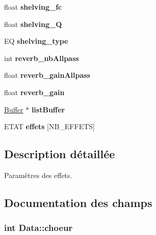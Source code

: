 \begin{DoxyCompactItemize}
\item 
float {\bfseries shelving\+\_\+fc}\hypertarget{structData_acc41c5321d720af7ef090304d57bebbe}{}\label{structData_acc41c5321d720af7ef090304d57bebbe}

\item 
float {\bfseries shelving\+\_\+Q}\hypertarget{structData_a94dc3fd1f3e36f82829b924f50635261}{}\label{structData_a94dc3fd1f3e36f82829b924f50635261}

\item 
EQ {\bfseries shelving\+\_\+type}\hypertarget{structData_afa24b396e1bab1c62d9f907f612d84e5}{}\label{structData_afa24b396e1bab1c62d9f907f612d84e5}

\item 
int {\bfseries reverb\+\_\+nb\+Allpass}\hypertarget{structData_a6c79dd2b8f931de7625d41825c019465}{}\label{structData_a6c79dd2b8f931de7625d41825c019465}

\item 
float {\bfseries reverb\+\_\+gain\+Allpass}\hypertarget{structData_a32da853563412f0858c7380d53f6ac33}{}\label{structData_a32da853563412f0858c7380d53f6ac33}

\item 
float {\bfseries reverb\+\_\+gain}\hypertarget{structData_a3724077b28fcb6d90a76b1ec069e4576}{}\label{structData_a3724077b28fcb6d90a76b1ec069e4576}

\item 
\hyperlink{structBuffer}{Buffer} $\ast$ {\bfseries list\+Buffer}\hypertarget{structData_ad8144307f2fe566d717719a07ae3fd36}{}\label{structData_ad8144307f2fe566d717719a07ae3fd36}

\item 
E\+T\+AT {\bfseries effets} \mbox{[}N\+B\+\_\+\+E\+F\+F\+E\+TS\mbox{]}\hypertarget{structData_aec895ebeebd83409b566dbab730e38d2}{}\label{structData_aec895ebeebd83409b566dbab730e38d2}

\end{DoxyCompactItemize}


\subsection{Description détaillée}
Paramètres des effets. 

\subsection{Documentation des champs}
\subsubsection[{\texorpdfstring{choeur}{choeur}}]{\setlength{\rightskip}{0pt plus 5cm}int Data\+::choeur}\hypertarget{structData_abeda9313a40d5d26d05c8d5be57729ff}{}\label{structData_abeda9313a40d5d26d05c8d5be57729ff}
